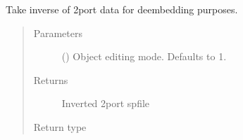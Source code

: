 \documentclass[letterpaper,10pt,english]{sphinxmanual}
\begin{document}
\begin{fulllineitems}
\begin{fulllineitems}
\end{fulllineitems}


\begin{fulllineitems}
\label{\detokenize{touchstone:touchstone.spfile.s2t}}
Take inverse of 2\sphinxhyphen{}port data for de\sphinxhyphen{}embedding purposes.
\begin{quote}\begin{description}
\item[{Parameters}] \leavevmode
{} (\sphinxstyleliteralemphasis{\sphinxupquote{, }}) \textendash{} Object editing mode. Defaults to \sphinxhyphen{}1.

\item[{Returns}] \leavevmode
Inverted 2\sphinxhyphen{}port spfile

\item[{Return type}] \leavevmode
{\hyperref[\detokenize{touchstone:touchstone.spfile}]{}}

\end{description}\end{quote}

\end{fulllineitems}


\begin{fulllineitems}
\label{\detokenize{touchstone:touchstone.spfile.scaledata}}
\end{fulllineitems}


\begin{fulllineitems}
\label{\detokenize{touchstone:touchstone.spfile.set_formulation}}
\end{fulllineitems}


\end{fulllineitems}
\end{document}
